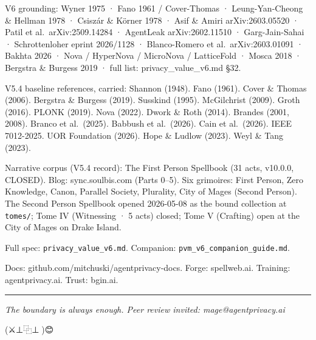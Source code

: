 \documentclass[
]{article}
\begin{document}
V6 grounding: Wyner 1975 · Fano 1961 / Cover-Thomas · Leung-Yan-Cheong
\& Hellman 1978 · Csiszár \& Körner 1978 · Asif \& Amiri
arXiv:2603.05520 · Patil et al.~arXiv:2509.14284 · AgentLeak
arXiv:2602.11510 · Garg-Jain-Sahai · Schrottenloher eprint 2026/1128 ·
Blanco-Romero et al.~arXiv:2603.01091 · Bakhta 2026 · Nova / HyperNova /
MicroNova / LatticeFold · Mosca 2018 · Bergstra \& Burgess 2019 · full
list: privacy\_value\_v6.md §32.

V5.4 baseline references, carried: Shannon (1948). Fano (1961). Cover \&
Thomas (2006). Bergstra \& Burgess (2019). Susskind (1995). McGilchrist
(2009). Groth (2016). PLONK (2019). Nova (2022). Dwork \& Roth (2014).
Brandes (2001, 2008). Branco et al.~(2025). Babbush et al.~(2026). Cain
et al.~(2026). IEEE 7012-2025. UOR Foundation (2026). Hope \& Ludlow
(2023). Weyl \& Tang (2023).

Narrative corpus (V5.4 record): The First Person Spellbook (31 acts,
v10.0.0, CLOSED). Blog: sync.soulbis.com (Parts 0--5). Six grimoires:
First Person, Zero Knowledge, Canon, Parallel Society, Plurality, City
of Mages (Second Person). The Second Person Spellbook opened 2026-05-08
as the bound collection at \texttt{tomes/}; Tome IV (Witnessing · 5
acts) closed; Tome V (Crafting) open at the City of Mages on Drake
Island.

Full spec: \texttt{privacy\_value\_v6.md}. Companion:
\texttt{pvm\_v6\_companion\_guide.md}.

Docs: github.com/mitchuski/agentprivacy-docs. Forge: spellweb.ai.
Training: agentprivacy.ai. Trust: bgin.ai.

\begin{center}\rule{0.5\linewidth}{0.5pt}\end{center}

\emph{The boundary is always enough. Peer review invited:
mage@agentprivacy.ai}

(⚔️⊥⿻⊥🧙)😊
\end{document}
